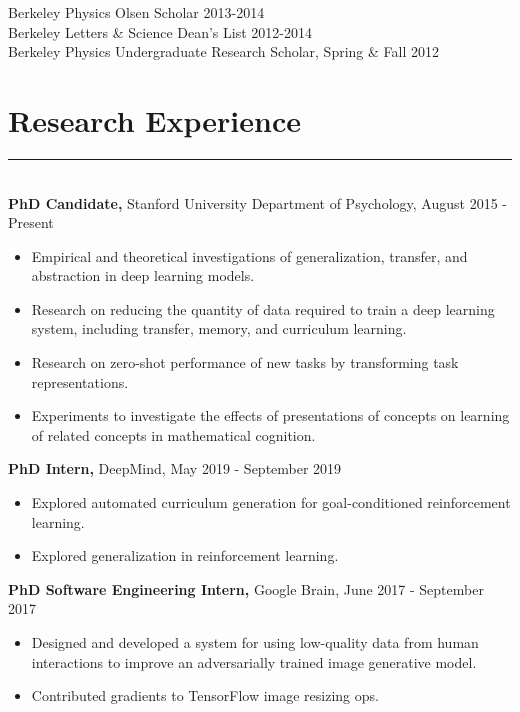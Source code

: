 \documentclass[margin]{res}
\begin{document}
\begin{resume}
Berkeley Physics Olsen Scholar 2013-2014 \\
Berkeley Letters \& Science Dean's List 2012-2014\\
Berkeley Physics Undergraduate Research Scholar, Spring \& Fall 2012
\vspace{1pt}\section{Research Experience} \vspace{-15pt} \rule{\textwidth}{0.5pt} \\[3pt]
{\bf PhD Candidate,} Stanford University Department of Psychology, August 2015 - Present 
\begin{itemize} \itemsep -2pt
  \item Empirical and theoretical investigations of generalization, transfer, and abstraction in deep learning models. 
  \item Research on reducing the quantity of data required to train a deep learning system, including transfer, memory, and curriculum learning.
  \item Research on zero-shot performance of new tasks by transforming task representations.
  \item Experiments to investigate the effects of presentations of concepts on learning of related concepts in mathematical cognition.
\end{itemize}\vspace{-8pt}
{\bf PhD Intern,} DeepMind, May 2019 - September 2019
\begin{itemize} \itemsep -2pt
  \item Explored automated curriculum generation for goal-conditioned reinforcement learning.
  \item Explored generalization in reinforcement learning.
\end{itemize}\vspace{-8pt}
{\bf PhD Software Engineering Intern,} Google Brain, June 2017 - September 2017 
\begin{itemize} \itemsep -2pt
  \item Designed and developed a system for using low-quality data from human interactions to improve an adversarially trained image generative model. 
  \item Contributed gradients to TensorFlow image resizing ops.
\end{itemize}\vspace{-8pt}

\end{resume}
\end{document}
